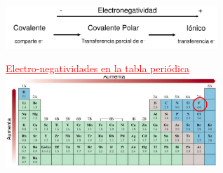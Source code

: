         \saltoPag{}
        \begin{center} \includegraphics[width=8cm]{./imagenes/evolucionElectronegatividad.png} \end{center}

        \begin{center} \textcolor{red}{\underline{Electro-negatividades en la tabla periódica}} \\[5pt] \includegraphics[width=8cm]{./imagenes/electronegatividadesEnLaTablaPeriodica.png} \end{center}

